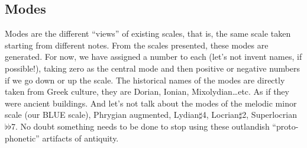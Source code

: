 \documentclass[]{report}
\begin{document}
\subsection{Modes}
Modes are the different ``views'' of existing scales, that is, the same scale taken starting from different notes.
From the scales presented, these modes are generated. For now, we have assigned a number to each (let's not invent names, if possible!), taking zero as the central mode and then positive or negative numbers if we go down or up the scale.
The historical names of the modes are directly taken from Greek culture, they are \textsf{Dorian}, \textsf{Ionian}, \textsf{Mixolydian}\ldots etc. As if they were ancient buildings. And let's not talk about the modes of the melodic minor scale (our \textsf{BLUE} scale), \textsf{Phrygian augmented}, \textsf{Lydian$\sharp$4}, \textsf{Locrian$\sharp$2}, \textsf{Superlocrian $\flat$$\flat$7}. No doubt something needs to be done to stop using these outlandish ``proto-phonetic'' artifacts of antiquity.
\end{document}
